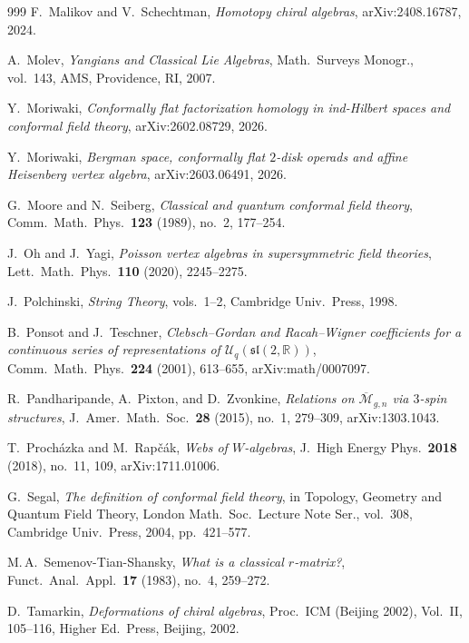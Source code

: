 \documentclass[11pt]{memoir}
\begin{document}
\begin{thebibliography}{999}
 F.~Malikov and V.~Schechtman, \emph{Homotopy chiral algebras}, arXiv:2408.16787, 2024.

 A.~Molev, \emph{Yangians and Classical Lie Algebras}, Math.\ Surveys Monogr., vol.~143, AMS, Providence, RI, 2007.

 Y.~Moriwaki, \emph{Conformally flat factorization homology in ind-Hilbert spaces and conformal field theory}, arXiv:2602.08729, 2026.

 Y.~Moriwaki, \emph{Bergman space, conformally flat $2$-disk operads and affine Heisenberg vertex algebra}, arXiv:2603.06491, 2026.

 G.~Moore and N.~Seiberg, \emph{Classical and quantum conformal field theory}, Comm.\ Math.\ Phys.\ \textbf{123} (1989), no.~2, 177--254.

 J.~Oh and J.~Yagi, \emph{Poisson vertex algebras in supersymmetric field theories}, Lett.\ Math.\ Phys.\ \textbf{110} (2020), 2245--2275.

 J.~Polchinski, \emph{String Theory}, vols.~1--2, Cambridge Univ.\ Press, 1998.

 B.~Ponsot and J.~Teschner, \emph{Clebsch--Gordan and Racah--Wigner coefficients for a continuous series of representations of $\mathcal{U}_q(\mathfrak{sl}(2,\mathbb{R}))$}, Comm.\ Math.\ Phys.\ \textbf{224} (2001), 613--655, arXiv:math/0007097.

 R.~Pandharipande, A.~Pixton, and D.~Zvonkine, \emph{Relations on $\overline{\mathcal{M}}_{g,n}$ via $3$-spin structures}, J.\ Amer.\ Math.\ Soc.\ \textbf{28} (2015), no.~1, 279--309, arXiv:1303.1043.

 T.~Proch\'azka and M.~Rap\v{c}\'ak, \emph{Webs of $W$-algebras}, J.\ High Energy Phys.\ \textbf{2018} (2018), no.~11, 109, arXiv:1711.01006.

 G.~Segal, \emph{The definition of conformal field theory}, in Topology, Geometry and Quantum Field Theory, London Math.\ Soc.\ Lecture Note Ser., vol.~308, Cambridge Univ.\ Press, 2004, pp.~421--577.

 M.\,A.~Semenov-Tian-Shansky, \emph{What is a classical $r$-matrix?}, Funct.\ Anal.\ Appl.\ \textbf{17} (1983), no.~4, 259--272.

 D.~Tamarkin, \emph{Deformations of chiral algebras}, Proc.\ ICM (Beijing 2002), Vol.~II, 105--116, Higher Ed.\ Press, Beijing, 2002.


\end{thebibliography}
\end{document}
